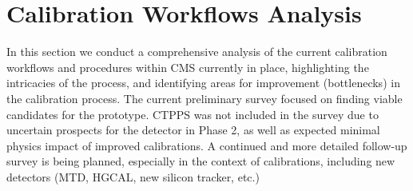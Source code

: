 \section{Calibration Workflows Analysis}
In this section we conduct a comprehensive analysis of the current calibration workflows and procedures within CMS currently in place, highlighting the intricacies of the process, and identifying areas for improvement (bottlenecks) in the calibration process.
The current preliminary survey focused on finding viable candidates for the prototype. CTPPS was not included in the survey due to uncertain prospects for the detector in Phase 2, as well as expected minimal physics impact of improved calibrations.
A continued and more detailed follow-up survey is being planned, especially in the context of \Phasetwo calibrations, including new detectors (MTD, HGCAL, new silicon tracker, etc.)

%


